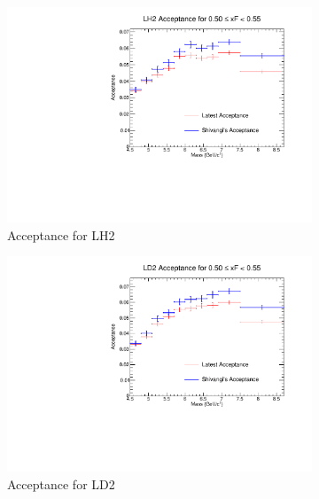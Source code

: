\documentclass[11pt]{article}
\begin{document}
\begin{figure}[p]
    \centering
    \begin{subfigure}[b]{0.48\textwidth}
       \includegraphics[width=\linewidth]{./acceptancePlots/LH2_acceptance_xF_bin_10.pdf}
       \caption{Acceptance for LH2}
    \end{subfigure}\hfill
    \begin{subfigure}[b]{0.48\textwidth}
       \includegraphics[width=\linewidth]{./acceptancePlots/LD2_acceptance_xF_bin_10.pdf}
       \caption{Acceptance for LD2}
    \end{subfigure}
    \begin{subfigure}[b]{0.48\textwidth}

\end{subfigure}
\end{figure}
\end{document}
